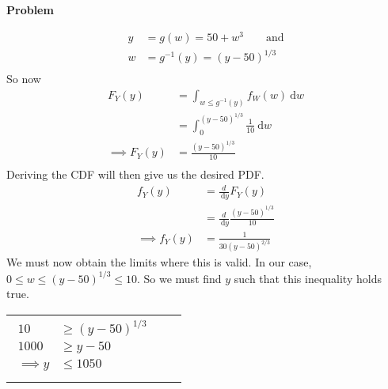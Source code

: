 \documentclass[12pt]{article}
\newenvironment{Ex}{\textbf{Problem}\vspace{.75em}\\}{}
\newcommand{\dd}[1]{\:\mathrm{d}{#1}}
\begin{document}
\begin{enumerate}
\begin{Ex}
\begin{solution}
\begin{enumerate}
\begin{equation}
          \label{eq:4b-setup}
          \begin{aligned}
            y &= g(w) = 50 + w^3  \quad\quad\text{and} \\
            w &= g^{-1}(y) = (y-50)^{1/3} \\
          \end{aligned}
        \end{equation}
        So now
        \begin{equation}
          \label{eq:4b-cdf}
          \begin{aligned}
            F_Y(y) &= \int_{w\le g^{-1}(y)} f_W(w) \dd{w} \\
            &= \int_{0}^{(y-50)^{1/3}} \frac{1}{10} \dd{w} \\
            \implies F_Y(y) &= \frac{(y-50)^{1/3}}{10} \\
          \end{aligned}
        \end{equation}
        Deriving the CDF will then give us the desired PDF.
        \begin{equation}
          \label{eq:4b-pdf}
          \begin{aligned}
            f_Y(y) &= \frac{d}{\dd{y}} F_Y(y) \\
            &= \frac{d}{\dd{y}} \frac{(y-50)^{1/3}}{10} \\
            \implies f_Y(y) &= \frac{1}{30 (y-50)^{2/3}}
          \end{aligned}
        \end{equation}
        We must now obtain the limits where this is valid. In our
        case, $0\le w \le (y-50)^{1/3} \le 10$. So we must find $y$
        such that this inequality holds true.
        \begin{table}[H]
          \label{eq:4b-limits}
          \begin{tabularx}{\linewidth}{XX}
            \begin{equation}
              \begin{aligned}
                10 &\ge(y-50)^{1/3} \\
                1000 &\ge y-50 \\
                \implies y &\le 1050 \\
              \end{aligned}
            \end{equation}
            &
            \begin{equation}
              \begin{aligned}

\end{aligned}
\end{equation}
\end{tabularx}
\end{table}
\end{enumerate}
\end{solution}
\end{Ex}
\end{enumerate}
\end{document}
